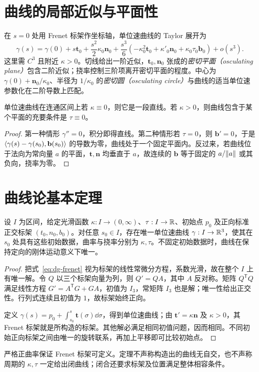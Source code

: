 \section{曲线的局部近似与平面性}
在 $s=0$ 处用 Frenet 标架作坐标轴，单位速曲线的 Taylor 展开为
\begin{equation}
 \gamma(s)=\gamma(0)+s\mathbf t_0+\frac{s^2}{2}\kappa_0\mathbf n_0
 +\frac{s^3}{6}(-\kappa_0^2\mathbf t_0+\kappa'_0\mathbf n_0
 +\kappa_0\tau_0\mathbf b_0)+o(s^3).
 \label{eq:dg-curve-taylor}
\end{equation}
这里需 $C^3$ 且附近 $\kappa>0$。切线给出一阶近似，$\mathbf t_0,\mathbf n_0$ 张成的\emph{密切平面（osculating plane）}包含二阶近似；挠率控制三阶项离开密切平面的程度。中心为 $\gamma(0)+\mathbf n_0/\kappa_0$、半径为 $1/\kappa_0$ 的\emph{密切圆（osculating circle）}与曲线的适当单位速参数化在二阶导数上匹配。

\begin{proposition}[零曲率与零挠率]
单位速曲线在连通区间上若 $\kappa\equiv0$，则它是一段直线。若 $\kappa>0$，则曲线包含于某个平面的充要条件是 $\tau\equiv0$。
\end{proposition}
\begin{proof}
第一种情形 $\gamma''=0$，积分即得直线。第二种情形若 $\tau=0$，则 $\mathbf b'=0$，于是 $\langle \gamma(s)-\gamma(s_0),\mathbf b(s_0)\rangle$ 的导数为零，曲线处于一个固定平面内。反过来，若曲线位于法向为常向量 $a$ 的平面，$\mathbf t,\mathbf n$ 均垂直于 $a$，故连续的 $\mathbf b$ 等于固定的 $a/\lVert a\rVert$ 或其负向，挠率为零。
\end{proof}

\section{曲线论基本定理}
\begin{theorem}[曲率与挠率决定曲线]
设 $I$ 为区间，给定光滑函数 $\kappa:I\to(0,\infty)$、$\tau:I\to\mathbb R$、初始点 $p_0$ 及正向标准正交标架 $(t_0,n_0,b_0)$。对任意 $s_0\in I$，存在唯一单位速曲线 $\gamma:I\to\mathbb R^3$，使其在 $s_0$ 处具有这些初始数据，曲率与挠率分别为 $\kappa,\tau$。不固定初始数据时，曲线在保持定向的刚体运动意义下唯一。
\label{thm:dg-curve-fundamental}
\end{theorem}
\begin{proof}
把式~\eqref{eq:dg-frenet} 视为标架的线性常微分方程，系数光滑，故在整个 $I$ 上有唯一解。令 $Q$ 以三个标架向量为列，则 $Q'=QA$，其中 $A$ 反对称。矩阵 $Q^{\mathsf T}Q$ 满足线性方程 $G'=A^{\mathsf T}G+GA$，初值为 $I_3$，常矩阵 $I_3$ 也是解；唯一性给出正交性。行列式连续且初值为 $1$，故标架始终正向。

定义 $\gamma(s)=p_0+\int_{s_0}^s\mathbf t(\sigma)\dd\sigma$，得到单位速曲线；由 $\mathbf t'=\kappa\mathbf n$ 及 $\kappa>0$，其 Frenet 标架就是所构造的标架。其他解必满足相同初值问题，因而相同。不同初始正向标架之间由唯一的旋转联系，再加上平移即可比较初始点。
\end{proof}
严格正曲率保证 Frenet 标架可定义。定理不声称构造出的曲线无自交，也不声称周期的 $\kappa,\tau$ 一定给出闭曲线；闭合还要求标架及位置满足整体相容条件。

